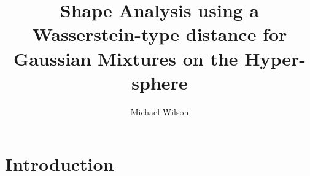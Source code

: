 \documentclass[]{article}
\title{Shape Analysis using a Wasserstein-type distance for Gaussian Mixtures on the Hyper-sphere}
\author{Michael Wilson}
\begin{document}
\maketitle

%

\section{Introduction}
\end{document}
